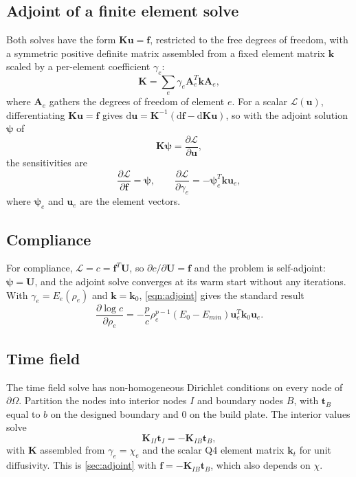 \documentclass{article}
\begin{document}
\subsection{Adjoint of a finite element solve}
\label{sec:adjoint}
Both solves have the form $\mathbf{K}\mathbf{u} = \mathbf{f}$, restricted to the free degrees of freedom, with a symmetric positive definite matrix assembled from a fixed element matrix $\mathbf{k}$ scaled by a per-element coefficient $\gamma_e$:
\[
    \mathbf{K} = \sum_e \gamma_e \mathbf{A}_e^T \mathbf{k} \mathbf{A}_e,
\]
where $\mathbf{A}_e$ gathers the degrees of freedom of element $e$.
For a scalar $\mathcal{L}(\mathbf{u})$, differentiating $\mathbf{K}\mathbf{u} = \mathbf{f}$ gives $\mathrm{d}\mathbf{u} = \mathbf{K}^{-1}\left(\mathrm{d}\mathbf{f} - \mathrm{d}\mathbf{K}\mathbf{u}\right)$, so with the adjoint solution $\bm{\psi}$ of
\[
    \mathbf{K}\bm{\psi} = \frac{\partial \mathcal{L}}{\partial \mathbf{u}},
\]
the sensitivities are
\begin{equation}
    \frac{\partial \mathcal{L}}{\partial \mathbf{f}} = \bm{\psi},
    \qquad
    \frac{\partial \mathcal{L}}{\partial \gamma_e} = -\bm{\psi}_e^T \mathbf{k} \mathbf{u}_e,
    \label{eqn:adjoint}
\end{equation}
where $\bm{\psi}_e$ and $\mathbf{u}_e$ are the element vectors.

\subsection{Compliance}
For compliance, $\mathcal{L} = c = \mathbf{f}^T\mathbf{U}$, so $\partial c / \partial \mathbf{U} = \mathbf{f}$ and the problem is self-adjoint: $\bm{\psi} = \mathbf{U}$, and the adjoint solve converges at its warm start without any iterations.
With $\gamma_e = E_e(\rho_e)$ and $\mathbf{k} = \mathbf{k}_0$, \autoref{eqn:adjoint} gives the standard result
\[
    \frac{\partial \log c}{\partial \rho_e}
    = -\frac{p}{c} \rho_e^{p-1}\left(E_0 - E_{min}\right) \mathbf{u}_e^T \mathbf{k}_0 \mathbf{u}_e .
\]

\subsection{Time field}
The time field solve has non-homogeneous Dirichlet conditions on every node of $\partial\Omega$.
Partition the nodes into interior nodes $I$ and boundary nodes $B$, with $\mathbf{t}_B$ equal to $b$ on the designed boundary and 0 on the build plate.
The interior values solve
\[
    \mathbf{K}_{II}\mathbf{t}_I = -\mathbf{K}_{IB}\mathbf{t}_B,
\]
with $\mathbf{K}$ assembled from $\gamma_e = \chi_e$ and the scalar Q4 element matrix $\mathbf{k}_t$ for unit diffusivity.
This is \autoref{sec:adjoint} with $\mathbf{f} = -\mathbf{K}_{IB}\mathbf{t}_B$, which also depends on $\chi$.
\end{document}

